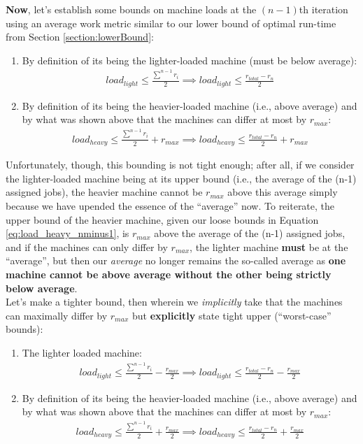 \documentclass[conference]{styles/acmsiggraph}
\newcommand{\?}{\stackrel{?}{=}}
\begin{document}
\textbf{Now}, let's establish some bounds on machine loads at the $(n-1)$th iteration using an average work metric similar to our lower bound of optimal run-time from Section \ref{section:lowerBound}:
\begin{enumerate}
    \item By definition of its being the lighter-loaded machine (must be below average):
    \begin{align} \label{eq:load_light_nminus1}
        load_{light} \leq \frac{\sum_{}^{n-1}{r_i}}{2} \implies load_{light} \leq \frac{r_{total}-r_n}{2}
    \end{align}
    \item By definition of its being the heavier-loaded machine (i.e., above average) and by what was shown above that the machines can differ at most by $r_{max}$: 
    \begin{align} \label{eq:load_heavy_nminus1}
        load_{heavy} \leq \frac{\sum_{}^{n-1}{r_i}}{2} + r_{max} \implies load_{heavy} \leq \frac{r_{total}-r_n}{2} + r_{max}
    \end{align}
\end{enumerate}
Unfortunately, though, this bounding is not tight enough; after all, if we consider the lighter-loaded machine being at its upper bound (i.e., the average of the (n-1) assigned jobs), the heavier machine cannot be $r_{max}$ above this average simply because we have upended the essence of the \enquote{average} now.  To reiterate, the upper bound of the heavier machine, given our loose bounds in Equation \ref{eq:load_heavy_nminus1}, is $r_{max}$ above the average of the (n-1) assigned jobs, and if the machines can only differ by $r_{max}$, the lighter machine \textbf{must} be at the \enquote{average}, but then our \textit{average} no longer remains the so-called average as \textbf{one machine cannot be above average without the other being strictly below average}. \\

Let's make a tighter bound, then wherein we \textit{implicitly} take that the machines can maximally differ by $r_{max}$ but \textbf{explicitly} state tight upper (\enquote{worst-case} bounds):

\begin{enumerate}
    \item The lighter loaded machine:
    \begin{align} \label{eq:load_light_tight}
        load_{light} \leq \frac{\sum_{}^{n-1}{r_i}}{2} - \frac{r_{max}}{2}\implies load_{light} \leq \frac{r_{total}-r_n}{2} - \frac{r_{max}}{2}
    \end{align}
    \item By definition of its being the heavier-loaded machine (i.e., above average) and by what was shown above that the machines can differ at most by $r_{max}$: 
    \begin{align} \label{eq:load_heavy_tight}
        load_{heavy} \leq \frac{\sum_{}^{n-1}{r_i}}{2} + \frac{r_{max}}{2} \implies load_{heavy} \leq \frac{r_{total}-r_n}{2} + \frac{r_{max}}{2}
    \end{align}
\end{enumerate}
\end{document}
